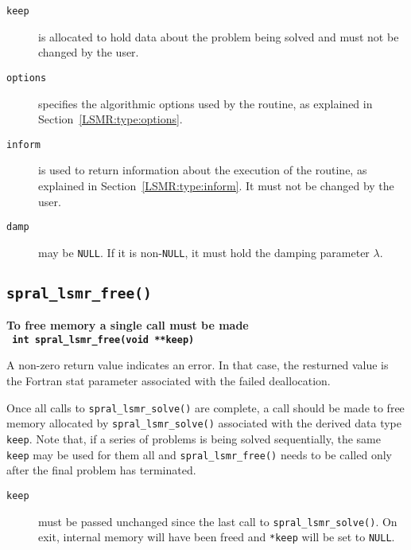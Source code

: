 \begin{description}
\item[\texttt{keep}] is allocated to hold data about the problem being
solved and must not be changed by the user.

\item[\texttt{options}] specifies the algorithmic options used by the routine,
as explained in Section~\ref{LSMR:type:options}.

\item[\texttt{inform}] is used to return information about the execution
of the routine, as explained in Section~\ref{LSMR:type:inform}.
It must not be changed by the user.

\item[\texttt{damp}] may be \texttt{NULL}. If it is non-\texttt{NULL}, it must
hold the damping parameter $\lambda$.

\end{description}



\subsection{\texttt{spral\_lsmr\_free()}}
\textbf{To free memory a single call must be made
   \vspace{0.2cm}\\
    \texttt{ \hspace*{0.2cm}
      int spral\_lsmr\_free(void **keep)
   }
}
\vspace{0.2cm}

\noindent
A non-zero return value indicates an error. In that case, the resturned value
is the Fortran stat parameter associated with the failed deallocation.

\noindent
Once all  calls to \texttt{spral\_lsmr\_solve()} are complete,
a call should be made to free memory  allocated by
\texttt{spral\_lsmr\_solve()}  associated with the derived data type {\tt keep}.
Note that, if a series of problems is being solved sequentially, the same {\tt keep}
may be used for them all and {\tt spral\_lsmr\_free()} needs to be called only
after the final problem has terminated.

\begin{description}

\item[\texttt{keep}] must be passed unchanged since the last call to \texttt{spral\_lsmr\_solve()}.
On exit, internal memory will have been freed and \texttt{*keep}
will be set to \texttt{NULL}.

\end{description}



